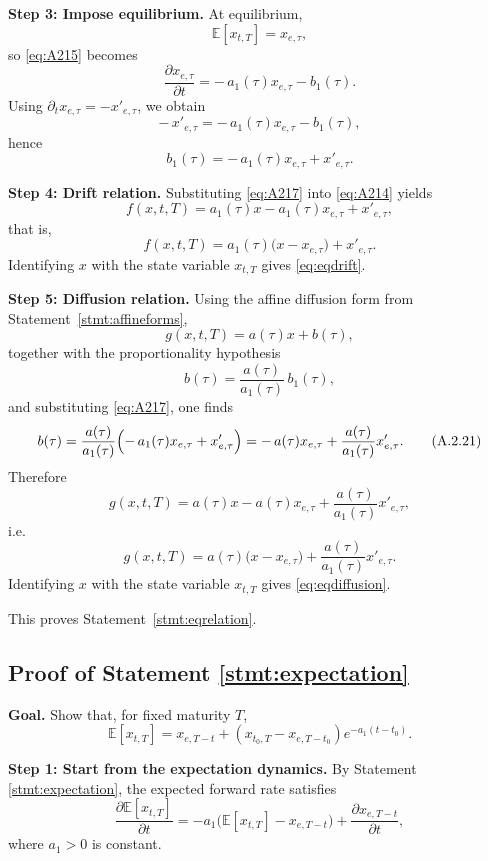 \documentclass[12pt]{article}
\theoremstyle{statementstyle}
\begin{document}
\begin{appendices}
\medskip
\noindent\textbf{Step 3: Impose equilibrium.}  
At equilibrium,
\[
\mathbb{E}[x_{t,T}]=x_{e,\tau},
\]
so \eqref{eq:A215} becomes
\[
\frac{\partial x_{e,\tau}}{\partial t}
=
-\,a_1(\tau)x_{e,\tau}-b_1(\tau).
\tag{A.2.16}
\]
Using \(\partial_t x_{e,\tau}=-x'_{e,\tau}\), we obtain
\[
-\,x'_{e,\tau}
=
-\,a_1(\tau)x_{e,\tau}-b_1(\tau),
\]
hence
\[
b_1(\tau)
=
-\,a_1(\tau)x_{e,\tau}+x'_{e,\tau}.
\tag{A.2.17}\label{eq:A217}
\]

\medskip
\noindent\textbf{Step 4: Drift relation.}  
Substituting \eqref{eq:A217} into \eqref{eq:A214} yields
\[
f(x,t,T)
=
a_1(\tau)x-a_1(\tau)x_{e,\tau}+x'_{e,\tau},
\]
that is,
\[
f(x,t,T)
=
a_1(\tau)\bigl(x-x_{e,\tau}\bigr)+x'_{e,\tau}.
\tag{A.2.18}
\]
Identifying \(x\) with the state variable \(x_{t,T}\) gives
\eqref{eq:eqdrift}.

\medskip
\noindent\textbf{Step 5: Diffusion relation.}  
Using the affine diffusion form from Statement~\ref{stmt:affineforms},
\[
g(x,t,T)=a(\tau)x+b(\tau),
\tag{A.2.19}
\]
together with the proportionality hypothesis
\[
b(\tau)=\frac{a(\tau)}{a_1(\tau)}\,b_1(\tau),
\tag{A.2.20}
\]
and substituting \eqref{eq:A217}, one finds
\[
b(\tau)
=
\frac{a(\tau)}{a_1(\tau)}
\Bigl(-\,a_1(\tau)x_{e,\tau}+x'_{e,\tau}\Bigr)
=
-\,a(\tau)x_{e,\tau}+\frac{a(\tau)}{a_1(\tau)}x'_{e,\tau}.
\tag{A.2.21}
\]
Therefore
\[
g(x,t,T)
=
a(\tau)x-a(\tau)x_{e,\tau}+\frac{a(\tau)}{a_1(\tau)}x'_{e,\tau},
\]
i.e.
\[
g(x,t,T)
=
a(\tau)\bigl(x-x_{e,\tau}\bigr)
+
\frac{a(\tau)}{a_1(\tau)}x'_{e,\tau}.
\tag{A.2.22}
\]
Identifying \(x\) with the state variable \(x_{t,T}\) gives
\eqref{eq:eqdiffusion}.

\medskip
This proves Statement~\ref{stmt:eqrelation}.
\subsection{Proof of Statement \ref{stmt:expectation}}
\label{appendix:A3}

\textbf{Goal.}
Show that, for fixed maturity \(T\),
\[
\mathbb{E}[x_{t,T}]
=
x_{e,T-t}
+
\left(x_{t_0,T}-x_{e,T-t_0}\right)e^{-a_1(t-t_0)}.
\]

\medskip
\noindent\textbf{Step 1: Start from the expectation dynamics.}
By Statement \ref{stmt:expectation}, the expected forward rate satisfies
\[
\frac{\partial \mathbb{E}[x_{t,T}]}{\partial t}
=
-a_1\bigl(\mathbb{E}[x_{t,T}] - x_{e,T-t}\bigr)
+
\frac{\partial x_{e,T-t}}{\partial t},
\]
where \(a_1>0\) is constant.


\end{appendices}
\end{document}
